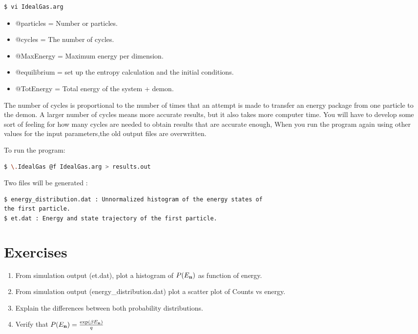 \documentclass[10pt]{article}
\begin{document}
\begin{lstlisting}[language=bash]
$ vi IdealGas.arg
\end{lstlisting} 

\begin{itemize}

\item @particles   = Number or particles.
\item @cycles = The number of cycles.
\item @MaxEnergy = Maximum energy per dimension.
\item @equilibrium = set up the entropy calculation and the initial conditions.
\item @TotEnergy = Total energy of the system + demon.
\end{itemize}

The number of cycles is proportional to the number of times that an attempt is made to transfer an energy package from one particle to the demon. A larger number of cycles means more accurate results, but it also takes more computer time. You will have to develop some sort of feeling for how many cycles are needed to obtain results that are accurate enough, When you run the program again using other values for the input parameters,the old output files are overwritten. 

To run the program:

\begin{lstlisting}[language=bash]
$ \.IdealGas @f IdealGas.arg > results.out
\end{lstlisting} 

Two files will be generated :

\begin{lstlisting}[language=bash]
$ energy_distribution.dat : Unnormalized histogram of the energy states of 
the first particle.
$ et.dat : Energy and state trajectory of the first particle.
\end{lstlisting}


\section{Exercises}

\begin{enumerate}
  \item From simulation output (et.dat), plot a histogram of $P(E_{\bf{n}})$ as function of energy.
  \item From simulation output (energy\_distribution.dat) plot a scatter plot of Counts vs energy. 
  \item Explain the differences between both probability distributions.

\item Verify that $P(E_{\bf{n}})=\frac{\exp (\beta E_{\bf{n}})}{q}$  

\end{enumerate}





\end{document}
